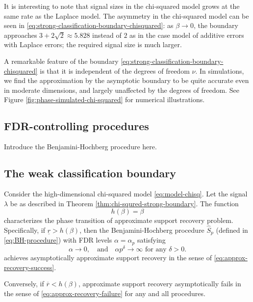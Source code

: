 It is interesting to note that signal sizes in the chi-squared model grows at the same rate as the Laplace model.
The asymmetry in the chi-squared model can be seen in \eqref{eq:strong-classification-boundary-chisquared}: as $\beta\to0$, the boundary approaches $3+2\sqrt{2} \approx 5.828$ instead of $2$ as in the case model of additive errors with Laplace errors; the required signal size is much larger.

A remarkable feature of the boundary \eqref{eq:strong-classification-boundary-chisquared} is that it is independent of the degrees of freedom $\nu$.
In simulations, we find the approximation by the asymptotic boundary to be quite accurate even in moderate dimensions, and largely unaffected by the degrees of freedom.
See Figure \ref{fig:phase-simulated-chi-squared} for numerical illustrations.

\subsection{FDR-controlling procedures}
\label{subsec:FDR-controlling-procedures}

Introduce the Benjamini-Hochberg procedure here.

\subsection{The weak classification boundary}
\label{subsec:weak-classification-boundary}

\begin{theorem} \label{thm:chi-squred-weak-boundary}
Consider the high-dimensional chi-squared model \eqref{eq:model-chisq}.
Let the signal $\lambda$ be as described in Theorem \ref{thm:chi-squred-strong-boundary}.
The function 
\begin{equation} \label{eq:weak-classification-boundary-chisquared}
    h(\beta) = \beta
\end{equation}
characterizes the phase transition of approximate support recovery problem.
Specifically, if $\underline{r} > {h}(\beta)$, then the Benjamini-Hochberg procedure $\widehat{S}_p$ (defined in \eqref{eq:BH-procedure}) with FDR levels $\alpha=\alpha_p$ satisfying
\begin{equation} \label{eq:FDR-rate-to-zero}
    \alpha\to 0,\quad \text{and} \quad \alpha p^\delta\to\infty \text{  for any } \delta>0.
\end{equation}
achieves asymptotically approximate support recovery in the sense of \eqref{eq:approx-recovery-success}. 

Conversely, if $\overline{r} < {h}(\beta)$, approximate support recovery asymptotically fails in the sense of \eqref{eq:approx-recovery-failure} for any and all procedures.
\end{theorem}
